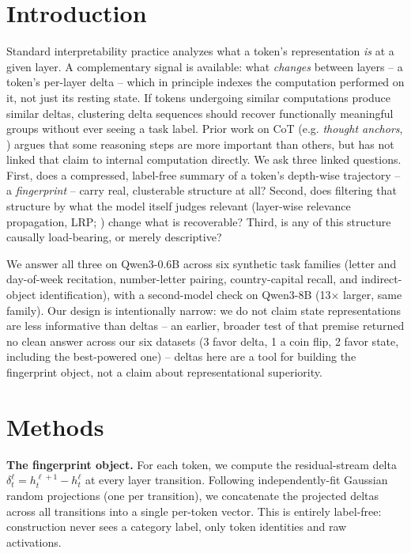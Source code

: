 \documentclass{article}
\theoremstyle{plain}
\theoremstyle{definition}
\theoremstyle{remark}
\begin{document}
\section{Introduction}
\label{sec:intro}

Standard interpretability practice analyzes what a token's representation \emph{is} at a
given layer. A complementary signal is available: what \emph{changes} between layers --
a token's per-layer delta -- which in principle indexes the computation performed on it,
not just its resting state. If tokens undergoing similar computations produce similar
deltas, clustering delta sequences should recover functionally meaningful groups without
ever seeing a task label. Prior work on CoT (e.g. \emph{thought anchors},
\citealp{thoughtanchors2025}) argues that some reasoning steps are more important than
others, but has not linked that claim to internal computation directly. We ask three
linked questions. First, does a compressed, label-free summary of a token's depth-wise
trajectory -- a \emph{fingerprint} -- carry real, clusterable structure at all? Second,
does filtering that structure by what the model itself judges relevant (layer-wise
relevance propagation, LRP; \citealp{bach2015lrp}) change what is recoverable? Third, is
any of this structure causally load-bearing, or merely descriptive?

We answer all three on Qwen3-0.6B \citep{qwen3} across six synthetic task families
(letter and day-of-week recitation, number-letter pairing, country-capital recall, and
indirect-object identification), with a second-model check on Qwen3-8B (13$\times$
larger, same family). Our design is intentionally narrow: we do not claim state
representations are less informative than deltas -- an earlier, broader test of that
premise returned no clean answer across our six datasets (3 favor delta, 1 a coin flip,
2 favor state, including the best-powered one) -- deltas here are a tool for building
the fingerprint object, not a claim about representational superiority.

\section{Methods}
\label{sec:methods}

\textbf{The fingerprint object.} For each token, we compute the residual-stream delta
$\delta_t^\ell = h_t^{\ell+1} - h_t^\ell$ at every layer transition. Following
independently-fit Gaussian random projections \citep{bingham2001random} (one per
transition), we concatenate the projected deltas across all transitions into a single
per-token vector. This is entirely label-free: construction never sees a category label,
only token identities and raw activations.
\end{document}
